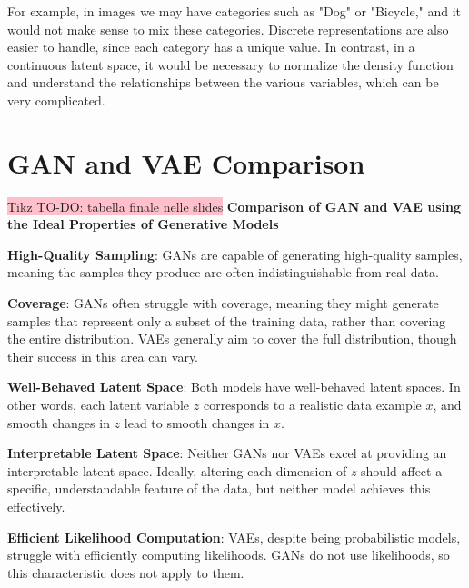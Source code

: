For example, in images we may have categories such as "Dog" or "Bicycle," and it would not make sense to mix these categories. Discrete representations are also easier to handle, since each category has a unique value. In contrast, in a continuous latent space, it would be necessary to normalize the density function and understand the relationships between the various variables, which can be very complicated.
    

\section{GAN and VAE Comparison}

{\color{red}\colorbox{pink}{Tikz TO-DO: tabella finale nelle slides}}
\textbf{Comparison of GAN and VAE using the Ideal Properties of Generative Models}

\textbf{High-Quality Sampling}: GANs are capable of generating high-quality samples, meaning the samples they produce are often indistinguishable from real data.

\textbf{Coverage}: GANs often struggle with coverage, meaning they might generate samples that represent only a subset of the training data, rather than covering the entire distribution. VAEs generally aim to cover the full distribution, though their success in this area can vary.

\textbf{Well-Behaved Latent Space}: Both models have well-behaved latent spaces. In other words, each latent variable $z$ corresponds to a realistic data example $x$, and smooth changes in $z$ lead to smooth changes in $x$.

\textbf{Interpretable Latent Space}: Neither GANs nor VAEs excel at providing an interpretable latent space. Ideally, altering each dimension of $z$ should affect a specific, understandable feature of the data, but neither model achieves this effectively.

\textbf{Efficient Likelihood Computation}: VAEs, despite being probabilistic models, struggle with efficiently computing likelihoods. GANs do not use likelihoods, so this characteristic does not apply to them.



